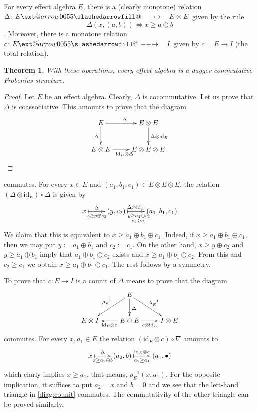 \documentclass{article}
\makeatletter
\newtheorem{theorem}{Theorem}[section]
\theoremstyle{definition}
\newcommand{\id}{\mathrm{id}}
\newcommand{\sto}{\xslashedrightarrow{\hskip 1pc}}
\def\slashedarrowfill@#1#2#3#4#5{%
  $\m@th\thickmuskip0mu\medmuskip\thickmuskip\thinmuskip\thickmuskip
  \relax#5#1\mkern-7mu%
  \cleaders\hbox{$#5\mkern-2mu#2\mkern-2mu$}\hfill
  \mathclap{#3}\mathclap{#2}%
  \cleaders\hbox{$#5\mkern-2mu#2\mkern-2mu$}\hfill
  \mkern-7mu#4$%
}
\def\rightslashedarrowfill@{%
  \slashedarrowfill@\relbar\relbar\mapstochar\rightarrow}
\newcommand\xslashedrightarrow[2][]{%
  \ext@arrow 0055{\rightslashedarrowfill@}{#1}{#2}}
\makeatother
\begin{document}
For every effect algebra $E$, there is a (clearly monotone) relation
$\Delta\colon E\sto E\otimes E$ given by the rule
$$
\Delta(x,(a,b))\Leftrightarrow x\geq a\oplus b
$$. Moreover, there is a monotone relation $c\colon E\sto I$ given by 
$c=E\to I$ (the total relation).
\begin{theorem}
With these operations, every effect algebra is a dagger commutative Frobenius
structure.
\end{theorem}
\begin{proof}
Let $E$ be an effect algebra. Clearly, $\Delta$ is cocommutative. 
Let us prove that $\Delta$ is coassociative. This amounts to
prove that the diagram
$$
\xymatrix{
E
	\ar[r]^{\Delta}
	\ar[d]_{\Delta}
&
E\otimes E
	\ar[d]^{\Delta\otimes\id_E}
\\
E\otimes E
	\ar[r]_{\id_E\otimes\Delta}
&
E\otimes E\otimes E
}
$$
\end{proof}
commutes. For every $x\in E$ and $(a_1,b_1,c_1)\in E\otimes E\otimes E$, the relation $(\Delta\otimes\id_E)\circ\Delta$
is given by
$$
\xymatrix{
x
	\ar@{|->}[r]^-{\Delta}_-{x\geq y\oplus c_2}
&
(y,c_2)
	\ar@{|->}[r]^-{\Delta\otimes\id_E}_{\substack{y\geq a_1\oplus
b_1\\c_2\geq c_1}}
&
(a_1,b_1,c_1)
}
$$
We claim that this is equivalent to $x\geq a_1\oplus b_1\oplus c_1$. Indeed,
if $x\geq a_1\oplus b_1\oplus c_1$, then we may put $y:=a_1\oplus b_1$ and
$c_2:=c_1$. On the other hand, $x\geq y\oplus c_2$ and $y\geq a_1\oplus b_1$ imply
that $a_1\oplus b_1\oplus c_2$ exists and $x\geq a_1\oplus b_1\oplus c_2$. From
this and $c_2\geq c_1$ we obtain $x\geq a_1\oplus b_1\oplus c_1$. The rest follows
by a symmetry.

To prove that $c\colon E\to I$ is a counit of $\Delta$ means to prove that
the diagram
$$
\xymatrix{
~
&
E
	\ar[ld]_-{\rho_E^{-1}}
	\ar[d]^{\Delta}
	\ar[rd]^{\lambda_E^{-1}}
\\
E\otimes I
&
E\otimes E
	\ar[l]^-{\id_E\otimes c}
	\ar[r]_-{c\otimes\id_E}
&
I\otimes E
}
$$
commutes.
For every $x,a_1\in E$ the relation $(\id_E\otimes c)\circ\nabla$ amounts to
\begin{equation}
\label{diag:counit}
\xymatrix {
x
	\ar@{|->}[r]^-{\Delta}_-{x\geq a_2\oplus b}
&
(a_2,b)
	\ar@{|->}[r]^-{\id_E\otimes c}_{a_2\geq a_1}
&
(a_1,\bullet)
}
\end{equation}
which clarly implies $x\geq a_1$, that means, $\rho_E^{-1}(x,a_1)$. For the
opposite implication, it suffices to put $a_2=x$ and $b=0$ and we see that
the left-hand triangle in \eqref{diag:counit} commutes. The commutativity
of the other triangle can be proved similarly.
\end{document}

